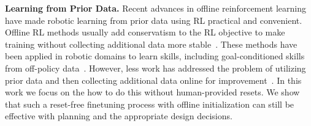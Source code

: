 \textbf{Learning from Prior Data.} Recent advances in offline reinforcement learning have made robotic learning from prior data using RL practical and convenient. Offline RL methods usually add conservatism to the RL objective to make training without collecting additional data more stable~\cite{lange2012batch, fujimoto2019off, kumar2019stabilizing, zhang2021brac, kumar2020conservative, fujimoto2021minimalist}. These methods have been applied in robotic domains to learn skills, including goal-conditioned skills from off-policy data~\cite{kalashnikov2021mtopt, yu2021conservative, chebotar2021actionable}. However, less work has addressed the problem of utilizing prior data and then collecting additional data online for improvement~\cite{nair2020awac, villaflor2020finetuning, lu2021awopt, Khazatsky2021WhatCI, lee2021finetuning, meng2021starcraft}. In this work we focus on the how to do this without human-provided resets. We show that such a reset-free finetuning process with offline initialization can still be effective with planning and the appropriate design decisions.


